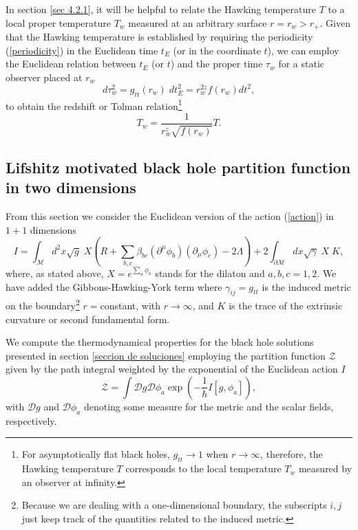 \documentclass[sn-mathphys,Numbered]{sn-jnl}%
\theoremstyle{thmstyleone}%
\theoremstyle{thmstyletwo}%
\theoremstyle{thmstylethree}%
\begin{document}
In section \ref{sec 4.2.1}, it will be helpful to relate the Hawking temperature $T$ to a local proper temperature $T_w$ measured at an arbitrary surface $r=r_w>r_+$. Given that the Hawking temperature is established by requiring the periodicity (\ref{periodicity}) in the Euclidean time $t_E$ (or in the coordinate $t$), we can employ the Euclidean relation between $t_E$ (or $t$) and the proper time $\tau_w$ for a static observer placed at $r_w$ 
%
\begin{equation}
    d \tau_w^{2} = g_{tt}(r_w)\; dt_E^{2} =r_{w}^{2z} f(r_w) dt^2,
\end{equation}
to obtain the redshift or Tolman relation\footnote{For asymptotically flat black holes, $g_{tt}\rightarrow 1$ when $r \rightarrow \infty$, therefore, the Hawking temperature $T$ corresponds to the local temperature $T_w$ measured by an observer at infinity.} \cite{Tolman}
%
\begin{equation}\label{tolman factor}
    T_w=\frac{1}{r_{w}^{z} \sqrt{f(r_{w})}} T.
\end{equation}

\subsection{Lifshitz motivated black hole partition function in two dimensions} \label{sec 4.2}

From this section we consider the Euclidean version of the action (\ref{action}) in $1+1$ dimensions
%
\begin{equation}\label{action with gibbons term}
    I= \int _{\mathcal{M}} d^{2} x \sqrt{g} \; X \left ( R + \sum_{b,c} \beta_{bc} (\partial^{\mu} \phi_b)(\partial_{\mu} \phi_c) - 2 \Lambda \right ) +2\int_{\partial \mathcal{M}} d x \sqrt{\gamma}\; X\; K, 
\end{equation}
%
where, as stated above, $X= e^{\sum_a \phi_a}$ stands for the dilaton and $a,b,c=1,2$. We have added the Gibbons-Hawking-York term \cite{Gibbons,York} where $\gamma_{ij}=g_{tt}$ is the induced metric on the boundary\footnote{Because we are dealing with a one-dimensional boundary, the subscripts $i,j$ just keep track of the quantities related to the induced metric.}   $r=$constant, with $r\rightarrow \infty$, and $K$ is the trace of the extrinsic curvature or second fundamental form. 

We compute the thermodynamical properties for the black hole solutions presented in section \ref{seccion de soluciones} employing the partition function $\mathcal{Z}$ given by the path integral weighted by the exponential of the Euclidean action $I$ \cite{Gibbons}
%
\begin{equation}
\mathcal{Z}=\int \mathcal{D} g \mathcal{D} \phi_a \exp \left(-\frac{1}{\hbar} I[g, \phi_a]\right),
\end{equation}
with $\mathcal{D} g$ and $\mathcal{D} \phi_a$ denoting some measure for the metric  and  the scalar fields, respectively.  
\end{document}
